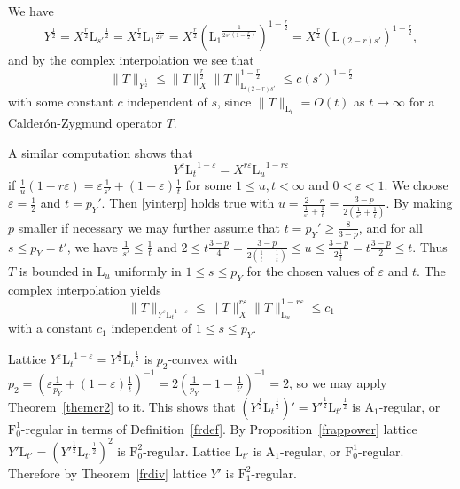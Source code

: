 \documentclass[12pt]{amsart}
\newcommand {\apclass} [1] {\ensuremath{\mathrm A_{#1}}}
\newcommand {\frclass} [2] {\ensuremath{\mathrm F^{#1}_{#2}}}
\newcommand {\lclassg} [1] {\ensuremath{\mathrm L_{#1}}}
\begin{document}
We have
$$
Y^{\frac 1 2} = X^{\frac r 2} \lclassg {s'}^{\frac 1 2} =
X^{\frac r 2} \lclassg {1}^{\frac 1 {2 s'}} =
X^{\frac r 2} \left(\lclassg {1}^{\frac 1 {2 s' \left(1 - \frac r 2\right)}}\right)^{1 - \frac r 2} = 
X^{\frac r 2} \left(\lclassg {(2 - r) s'} \right)^{1 - \frac r 2},
$$
and by the complex interpolation we see that
\begin {equation}
\label {tmest}
\|T\|_{Y^{\frac 1 2}} \leqslant \|T\|_X^{\frac r 2} \|T\|_{\lclassg {(2 - r) s'}}^{1 - \frac r 2} \leqslant
c (s')^{1 - \frac r 2}
\end {equation}
with some constant $c$ independent of $s$, since $\|T\|_{\lclassg {t}} = O (t)$ as $t \to \infty$ for a
Calder\'on-Zygmund operator $T$.

A similar computation shows that
\begin {equation}
\label {yinterp}
Y^\varepsilon \lclassg {t}^{1 - \varepsilon} = X^{r \varepsilon} \lclassg {u}^{1 - r \varepsilon}
\end {equation}
if $\frac 1 u (1 - r \varepsilon) = \varepsilon \frac 1 {s'} + (1 - \varepsilon) \frac 1 t$
for some $1 \leqslant u, t < \infty$ and $0 < \varepsilon < 1$.
We choose $\varepsilon = \frac 1 2$ and $t = p_Y'$.  Then \eqref {yinterp} holds true
with $u = \frac {2 - r} {\frac 1 {s'} + \frac 1 t} = \frac {3 - p} {2 \left(\frac 1 {s'} + \frac 1 t \right)}$.
By making $p$ smaller if necessary we may further assume that $t = p_Y' \geqslant \frac 8 {3 - p}$,
and for all $s \leqslant p_Y = t'$, we have $\frac 1 {s'} \leqslant \frac 1 {t}$ and
$2 \leqslant t \frac {3 - p} {4} = \frac {3 - p} {2 \left(\frac 1 t + \frac 1 t\right)}
\leqslant u \leqslant \frac {3 - p} {2 \frac 1 t} = t \frac {3 - p} {2} \leqslant t$.
Thus $T$ is bounded in $\lclassg {u}$
uniformly in $1 \leqslant s \leqslant p_Y$ for the chosen values of $\varepsilon$ and $t$.
The complex interpolation yields
$$
\|T\|_{Y^\varepsilon \lclassg {t}^{1 - \varepsilon}} \leqslant \|T\|_X^{r \varepsilon} \|T\|_{\lclassg {u}}^{1 - r \varepsilon} \leqslant c_1
$$
with a constant $c_1$ independent of $1 \leqslant s \leqslant p_Y$.

Lattice $Y^\varepsilon \lclassg {t}^{1 - \varepsilon} = Y^{\frac 1 2} \lclassg {t}^{\frac 1 2}$ is $p_2$-convex with
$p_2 = \left(\varepsilon \frac 1 {p_Y}  + (1 - \varepsilon) \frac 1 t\right)^{-1} =
2 \left(\frac 1 {p_Y} + 1 - \frac 1 {t'}\right)^{-1} = 2$,
so
we may apply Theorem~\ref {themcr2} to it.
This shows that $\left(Y^{\frac 1 2} \lclassg {t}^{\frac 1 2}\right)' = Y'^{\frac 1 2} \lclassg {t'}^{\frac 1 2}$ is
$\apclass {1}$-regular, or $\frclass {1} {0}$-regular in terms of Definition~\ref {frdef}.
By Proposition~\ref {frappower}
lattice $Y' \lclassg {t'} = \left(Y'^{\frac 1 2} \lclassg {t'}^{\frac 1 2}\right)^2$ is $\frclass {2} {0}$-regular.
Lattice $\lclassg {t'}$ is $\apclass {1}$-regular, or $\frclass {1} {0}$-regular.  Therefore
by Theorem~\ref {frdiv} lattice $Y'$ is $\frclass {2} {1}$-regular.
\end{document}
